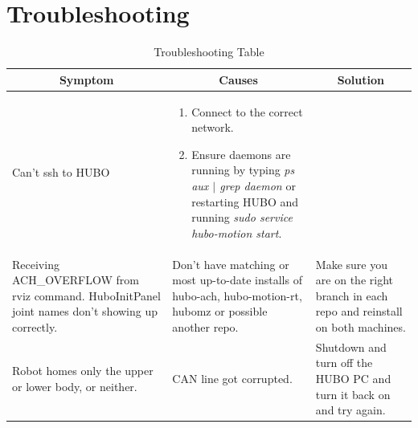 \documentclass[letterpaper, 10 pt]{report}
\begin{document}
\chapter{Troubleshooting}\label{chap:troubleshooting}
\begin{table}[ht]
  \centering
  \caption{Troubleshooting Table}
  \begin{tabular}{|p{4.5cm}|p{4.5cm}|p{4.5cm}|} \hline
    \multicolumn{1}{|c|}{Symptom} & \multicolumn{1}{|c|}{Causes} & \multicolumn{1}{|c|}{Solution} \\ \hline
    Can't ssh to HUBO \end{enumerate} & \begin{enumerate} \item Connect to the correct network. \item Ensure daemons are running by typing \textit{ps aux $|$ grep daemon} or restarting HUBO and running \textit{sudo service hubo-motion start}. \end{enumerate} \\
    \hline
    Receiving ACH\_OVERFLOW from rviz command. \newline HuboInitPanel joint names don't showing up correctly. & Don't have matching or most up-to-date installs of hubo-ach, hubo-motion-rt, hubomz or possible another repo. & Make sure you are on the right branch in each repo and reinstall on both machines. \\
    \hline
    Robot homes only the upper or lower body, or neither. & CAN line got corrupted. & Shutdown and turn off the HUBO PC and turn it back on and try again. \\
    \hline
  \end{tabular} \label{tbl:troubleshooting}
\end{table}


%

\end{document}
